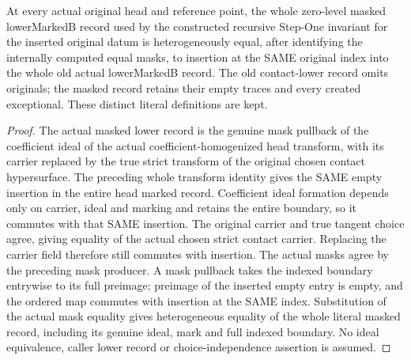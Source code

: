 \begin{theorem}
\label{hir:step-one-empty-insertion-masked-zero}
\leanok
At every actual original head and reference point, the whole zero-level masked lowerMarkedB record used by the constructed recursive Step-One invariant for the inserted original datum is heterogeneously equal, after identifying the internally computed equal masks, to insertion at the SAME original index into the whole old actual lowerMarkedB record. The old contact-lower record omits originals; the masked record retains their empty traces and every created exceptional. These distinct literal definitions are kept.
\end{theorem}
\begin{proof}
The actual masked lower record is the genuine mask pullback of the coefficient ideal of the actual coefficient-homogenized head transform, with its carrier replaced by the true strict transform of the original chosen contact hypersurface. The preceding whole transform identity gives the SAME empty insertion in the entire head marked record. Coefficient ideal formation depends only on carrier, ideal and marking and retains the entire boundary, so it commutes with that SAME insertion. The original carrier and true tangent choice agree, giving equality of the actual chosen strict contact carrier. Replacing the carrier field therefore still commutes with insertion. The actual masks agree by the preceding mask producer. A mask pullback takes the indexed boundary entrywise to its full preimage; preimage of the inserted empty entry is empty, and the ordered map commutes with insertion at the SAME index. Substitution of the actual mask equality gives heterogeneous equality of the whole literal masked record, including its genuine ideal, mark and full indexed boundary. No ideal equivalence, caller lower record or choice-independence assertion is assumed.
\end{proof}
